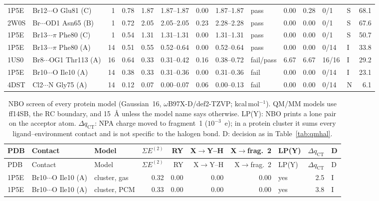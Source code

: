 \documentclass[journal=jcisd8,manuscript=suppinfo]{achemso}
\begin{document}
\begin{singlespace}
\begin{table}[!htbp]
{\begin{tabular}{llrrrlrlllrllr}
1P5E & Br12$\cdots$O Glu81 (C) & 1 & 0.78 & 1.87 & 1.87--1.87 & 0.00 & 1.87--1.87 & pass & 0.00 & 0.28 & 0/1 & S & 68.1\\
2W0S & Br$\cdots$OD1 Asn65 (B) & 1 & 0.72 & 2.05 & 2.05--2.05 & 0.23 & 2.28--2.28 & pass & 0.00 & 0.00 & 0/1 & S & 67.6\\
1P5E & Br13$\cdots$$\pi$ Phe80 (C) & 1 & 0.54 & 1.31 & 1.31--1.31 & 0.00 & 1.31--1.31 & pass & 0.00 & 0.00 & 0/1 & S & 50.7\\
1P5E & Br13$\cdots$$\pi$ Phe80 (A) & 14 & 0.51 & 0.55 & 0.52--0.64 & 0.00 & 0.52--0.64 & pass & 0.00 & 0.00 & 0/14 & I & 33.8\\
1US0 & Br8$\cdots$OG1 Thr113 (A) & 16 & 0.64 & 0.33 & 0.31--0.42 & 0.16 & 0.38--0.72 & fail/pass & 6.67 & 6.67 & 16/16 & I & 29.2\\
1P5E & Br10$\cdots$O Ile10 (A) & 14 & 0.38 & 0.33 & 0.31--0.36 & 0.00 & 0.31--0.36 & fail & 0.00 & 0.00 & 0/14 & I & 23.1\\
4DST & Cl2$\cdots$N Gly75 (A) & 14 & 0.12 & 0.07 & 0.00--0.07 & 0.06 & 0.00--0.13 & fail & 0.00 & 0.00 & 0/14 & N & 6.1\\
\bottomrule\end{tabular}}\end{table}
{\scriptsize
\setlength{\tabcolsep}{3pt}
\begin{longtable}{lllrrrrlrl}
\caption{NBO screen of every protein model (Gaussian~16, $\omega$B97X-D/def2-TZVP; kcal\,mol$^{-1}$). QM/MM models use ff14SB, the RC boundary, and \SI{15}{\angstrom} unless the model name says otherwise. LP(Y): NBO prints a lone pair on the acceptor atom. $\Delta q_\mathrm{CT}$: NPA charge moved to fragment~1 ($10^{-3}$~e); in a protein cluster it sums every ligand--environment contact and is not specific to the halogen bond. D: decision as in Table~\ref{tab:qmhal}.}\label{tab:qmprot}\\
\toprule
PDB & Contact & Model & $\Sigma E^{(2)}$ & RY & X$\to$Y--H & X$\to$frag.~2 & LP(Y) & $\Delta q_\mathrm{CT}$ & D\\
\midrule
\endfirsthead
\toprule
PDB & Contact & Model & $\Sigma E^{(2)}$ & RY & X$\to$Y--H & X$\to$frag.~2 & LP(Y) & $\Delta q_\mathrm{CT}$ & D\\
\midrule
\endhead
\bottomrule
\endlastfoot
1P5E & Br10$\cdots$O Ile10 (A) & cluster, gas & 0.32 & 0.00 & 0.00 & 0.00 & yes & 2.5 & I\\
1P5E & Br10$\cdots$O Ile10 (A) & cluster, PCM & 0.33 & 0.00 & 0.00 & 0.00 & yes & 3.8 & I\\

\end{longtable}}
\end{singlespace}
\end{document}
